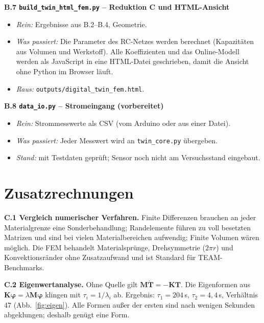 \documentclass[a4paper, 10pt, conference]{ieeeconf}
\newcommand{\anh}[1]{\par\medskip\noindent\textbf{#1}\quad}
\begin{document}
\anh{B.7 \texttt{build\_twin\_html\_fem.py} -- Reduktion C und HTML-Ansicht}
\begin{itemize}[leftmargin=*, nosep]
  \item \textit{Rein:} Ergebnisse aus B.2--B.4, Geometrie.
  \item \textit{Was passiert:} Die Parameter des RC-Netzes werden berechnet
        (Kapazitäten aus Volumen und Werkstoff). Alle Koeffizienten und das
        Online-Modell werden als JavaScript in eine HTML-Datei geschrieben,
        damit die Ansicht ohne Python im Browser läuft.
  \item \textit{Raus:} \texttt{outputs/digital\_twin\_fem.html}.
\end{itemize}

\anh{B.8 \texttt{data\_io.py} -- Stromeingang (vorbereitet)}
\begin{itemize}[leftmargin=*, nosep]
  \item \textit{Rein:} Strommesswerte als CSV (vom Arduino oder aus einer
        Datei).
  \item \textit{Was passiert:} Jeder Messwert wird an
        \texttt{twin\_core.py} übergeben.
  \item \textit{Stand:} mit Testdaten geprüft; Sensor noch nicht am
        Versuchsstand eingebaut.
\end{itemize}
\endgroup

\section{Zusatzrechnungen}
\label{app:extra}

\anh{C.1 Vergleich numerischer Verfahren.} Finite Differenzen brauchen an
jeder Materialgrenze eine Sonderbehandlung; Randelemente führen zu voll
besetzten Matrizen und sind bei vielen Materialbereichen aufwendig; Finite
Volumen wären möglich. Die FEM behandelt Materialsprünge, Drehsymmetrie
($2\pi r$) und Konvektionsränder ohne Zusatzaufwand und ist Standard für
TEAM-Benchmarks.

\anh{C.2 Eigenwertanalyse.} Ohne Quelle gilt
$\mathbf M\dot{\mathbf T} = -\mathbf K\mathbf T$. Die Eigenformen aus
$\mathbf K\boldsymbol\varphi = \lambda\mathbf M\boldsymbol\varphi$ klingen
mit $\tau_i = 1/\lambda_i$ ab. Ergebnis: $\tau_1 = 204$\,s,
$\tau_2 = 4{,}4$\,s, Verhältnis 47 (Abb.~\ref{fig:eigen}). Alle Formen außer
der ersten sind nach wenigen Sekunden abgeklungen; deshalb genügt eine Form.
\end{document}
